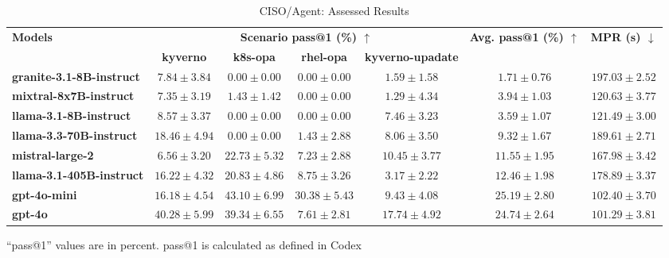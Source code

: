 \begin{table*}[h]
\small
\centering
\begin{threeparttable}
  \caption{CISO/Agent: Assessed Results}
  \label{tab:agent101}
  \begin{tabular}{@{}lcccccc@{}}
    \toprule
    \multirow{2}{*}{\textbf{Models}}
      & \multicolumn{4}{c}{\textbf{Scenario pass@1 (\%) $\uparrow$}}
      & \multirow{2}{*}{\textbf{Avg. pass@1 (\%) $\uparrow$ }} 
      & \multirow{2}{*}{\textbf{MPR (s) $\downarrow$}} \\
    \cmidrule(lr){2-5}
    & \textbf{kyverno}
    & \textbf{k8s-opa}
    & \textbf{rhel-opa}
    & \textbf{kyverno-upadate} \\
    \midrule
    \textbf{granite-3.1-8B-instruct} &
    $7.84 \pm 3.84$ &
    $0.00 \pm 0.00$ &
    $0.00 \pm 0.00$ &
    $1.59 \pm 1.58$ &
    $1.71 \pm 0.76$ &
    $197.03 \pm 2.52$ \\
    \textbf{mixtral-8x7B-instruct} &
    $7.35 \pm 3.19$ &
    $1.43 \pm 1.42$ &
    $0.00 \pm 0.00$ &
    $1.29 \pm 4.34$ &
    $3.94 \pm 1.03$ &
    $120.63 \pm 3.77$ \\
    \textbf{llama-3.1-8B-instruct} &
    $8.57 \pm 3.37$ &
    $0.00 \pm 0.00$ &
    $0.00 \pm 0.00$ &
    $7.46 \pm 3.23$ &
    $3.59 \pm 1.07$ &
    $121.49 \pm 3.00$ \\
    \textbf{llama-3.3-70B-instruct} &
    $18.46 \pm 4.94$ &
    $0.00 \pm 0.00$ &
    $1.43 \pm 2.88$ &
    $8.06 \pm 3.50$ &
    $9.32 \pm 1.67$ &
    $189.61 \pm 2.71$ \\
    \textbf{mistral-large-2} &
    $6.56 \pm 3.20$ &
    $22.73 \pm 5.32$ &
    $7.23 \pm 2.88$ &
    $10.45 \pm 3.77$ &
    $11.55 \pm 1.95$ &
    $167.98 \pm 3.42$ \\
    \textbf{llama-3.1-405B-instruct} &
    $16.22 \pm 4.32$ &
    $20.83 \pm 4.86$ &
    $8.75 \pm 3.26$ &
    $3.17 \pm 2.22$ &
    $12.46 \pm 1.98$ &
    $178.89 \pm 3.37$ \\
    \textbf{gpt-4o-mini} &
    $16.18 \pm 4.54$ &
    $43.10 \pm 6.99$ &
    $30.38 \pm 5.43$ &
    $9.43 \pm 4.08$ &
    $25.19 \pm 2.80$ &
    $102.40 \pm 3.70$ \\
    \textbf{gpt-4o} &
    $40.28 \pm 5.99$ &
    $39.34 \pm 6.55$ &
    $7.61 \pm 2.81$ &
    $17.74 \pm 4.92$ &
    $24.74 \pm 2.64$ &
    $101.29 \pm 3.81$ \\
    \bottomrule
  \end{tabular}
  \begin{tablenotes}
    \footnotesize
    \item ``pass@1'' values are in percent. pass@1 is calculated as defined in Codex~\cite{chen2021evaluating}\\

\end{tablenotes}
\end{threeparttable}
\end{table*}
